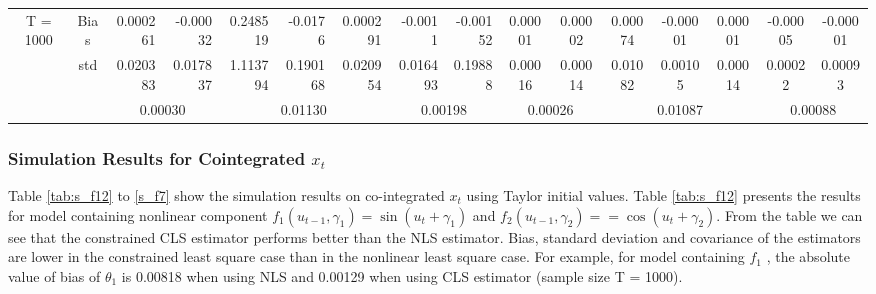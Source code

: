\documentclass[a4paper,12pt,times,numbered,print,index]{report}
\numberwithin{equation}{section}
\begin{document}
\begin{table}[htbp]
\begin{adjustbox}{max width=\textwidth}
\begin{tabular}{cccccccccccccccc}
		\multirow{3}[1]{*}{T = 1000} & Bias  & \multicolumn{1}{r}{0.000261} & \multicolumn{1}{r}{-0.00032} & \multicolumn{1}{r}{0.248519} & \multicolumn{1}{r}{-0.0176} & \multicolumn{1}{r}{0.000291} & \multicolumn{1}{r}{-0.0011} & \multicolumn{1}{r}{\textcolor[rgb]{ 0,  .439,  .753}{-0.00152}} & 0.00001 & 0.00002 & 0.00074 & -0.00001 & 0.00001 & -0.00005 & \textcolor[rgb]{ 0,  .439,  .753}{-0.00001} \\
		& std   & \multicolumn{1}{r}{0.020383} & \multicolumn{1}{r}{0.017837} & \multicolumn{1}{r}{1.113794} & \multicolumn{1}{r}{0.190168} & \multicolumn{1}{r}{0.020954} & \multicolumn{1}{r}{0.016493} & \multicolumn{1}{r}{0.19888} & 0.00016 & 0.00014 & 0.01082 & 0.00105 & 0.00014 & 0.00022 & 0.00093 \\
		&       & \multicolumn{2}{c}{\textcolor[rgb]{ .329,  .51,  .208}{0.00030}} & \multicolumn{3}{c}{\textcolor[rgb]{ .329,  .51,  .208}{0.01130}} & \multicolumn{2}{c}{\textcolor[rgb]{ .329,  .51,  .208}{0.00198}} & \multicolumn{2}{c}{\textcolor[rgb]{ .329,  .51,  .208}{0.00026}} & \multicolumn{3}{c}{\textcolor[rgb]{ .329,  .51,  .208}{0.01087}} & \multicolumn{2}{c}{\textcolor[rgb]{ .329,  .51,  .208}{0.00088}} \\
		\bottomrule
		\bottomrule
    	\end{tabular}%
	\end{adjustbox}
\label{nonco-f12}%
\end{table}%


\subsubsection{Simulation Results for Cointegrated $x_t$}
Table \ref{tab:s_f12} to \ref{s_f7} show the simulation results on co-integrated $x_t$ using Taylor initial values.  Table \ref{tab:s_f12} presents the results for model containing nonlinear component $f_1(u_{t-1}, \gamma_1) = \sin(u_t+\gamma_{1})$ and $f_2(u_{t-1}, \gamma_2) = = \cos(u_t+\gamma_{2})$. From the table we can see that the constrained CLS estimator performs better than the NLS estimator. Bias, standard deviation and covariance of the estimators are lower in the constrained least square case than in the nonlinear least square case. For example, for model containing $f_1$ , the absolute value of bias of $\theta_1$ is 0.00818 when using NLS and 0.00129 when using CLS estimator (sample size T = 1000). 
\end{document}
